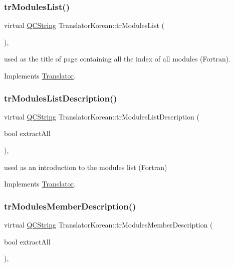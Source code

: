 \subsubsection{\texorpdfstring{trModulesList()}{trModulesList()}}
{\footnotesize\ttfamily virtual \mbox{\hyperlink{class_q_c_string}{Q\+C\+String}} Translator\+Korean\+::tr\+Modules\+List (\begin{DoxyParamCaption}{ }\end{DoxyParamCaption})\hspace{0.3cm}{\ttfamily [inline]}, {\ttfamily [virtual]}}

used as the title of page containing all the index of all modules (Fortran). 

Implements \mbox{\hyperlink{class_translator}{Translator}}.

\mbox{\label{class_translator_korean_a74f558d5fab07ab025eb2d83cbafc981}} 
\subsubsection{\texorpdfstring{trModulesListDescription()}{trModulesListDescription()}}
{\footnotesize\ttfamily virtual \mbox{\hyperlink{class_q_c_string}{Q\+C\+String}} Translator\+Korean\+::tr\+Modules\+List\+Description (\begin{DoxyParamCaption}\item[{bool}]{extract\+All }\end{DoxyParamCaption})\hspace{0.3cm}{\ttfamily [inline]}, {\ttfamily [virtual]}}

used as an introduction to the modules list (Fortran) 

Implements \mbox{\hyperlink{class_translator}{Translator}}.

\mbox{\label{class_translator_korean_a9d1ea9e499810c8dbc812fc976cd583a}} 
\subsubsection{\texorpdfstring{trModulesMemberDescription()}{trModulesMemberDescription()}}
{\footnotesize\ttfamily virtual \mbox{\hyperlink{class_q_c_string}{Q\+C\+String}} Translator\+Korean\+::tr\+Modules\+Member\+Description (\begin{DoxyParamCaption}\item[{bool}]{extract\+All }\end{DoxyParamCaption})\hspace{0.3cm}{\ttfamily [inline]}, {\ttfamily [virtual]}}


